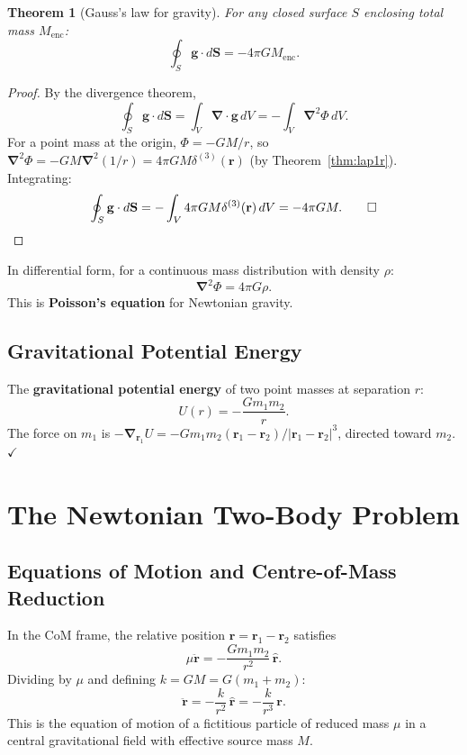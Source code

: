 \documentclass[12pt,a4paper]{article}
\theoremstyle{plain}
\newtheorem{theorem}{Theorem}[section]
\theoremstyle{definition}
\theoremstyle{remark}
\newcommand{\ve}[1]{\mathbf{#1}}           %
\newcommand{\er}{\hat{\mathbf{r}}}
\newcommand{\rv}{\ve{r}}
\newcommand{\gv}{\ve{g}}
\newcommand{\nab}{\boldsymbol{\nabla}}
\begin{document}
\begin{theorem}[Gauss's law for gravity]\label{thm:gauss}
For any closed surface $S$ enclosing total mass $M_{\mathrm{enc}}$:
\[
  \oint_S \gv\cdot d\ve{S} = -4\pi G M_{\mathrm{enc}}.
\]
\end{theorem}
\begin{proof}
By the divergence theorem,
\[
  \oint_S\gv\cdot d\ve{S}
  = \int_V\nab\cdot\gv\,dV
  = -\int_V\nab^2\Phi\,dV.
\]
For a point mass at the origin, $\Phi = -GM/r$, so $\nab^2\Phi = -GM\nab^2(1/r) = 4\pi GM\delta^{(3)}(\rv)$ (by Theorem~\ref{thm:lap1r}). Integrating:
\[
  \oint_S\gv\cdot d\ve{S} = -\int_V 4\pi GM\delta^{(3)}(\rv)\,dV = -4\pi GM. \qed
\]
\end{proof}

In differential form, for a continuous mass distribution with density $\rho$:
\begin{equation}\label{eq:poisson}
  \nab^2\Phi = 4\pi G\rho.
\end{equation}
This is \textbf{Poisson's equation} for Newtonian gravity.

\subsection{Gravitational Potential Energy}

The \textbf{gravitational potential energy} of two point masses at separation $r$:
\[
  U(r) = -\frac{Gm_1m_2}{r}.
\]
The force on $m_1$ is $-\nab_{\rv_1}U = -Gm_1m_2(\rv_1-\rv_2)/|\rv_1-\rv_2|^3$, directed toward $m_2$. $\checkmark$

\section{The Newtonian Two-Body Problem}

\subsection{Equations of Motion and Centre-of-Mass Reduction}

In the CoM frame, the relative position $\rv = \rv_1-\rv_2$ satisfies
\[
  \mu\ddot{\rv} = -\frac{Gm_1m_2}{r^2}\,\er.
\]
Dividing by $\mu$ and defining $k = GM = G(m_1+m_2)$:
\begin{equation}\label{eq:eom}
  \boxed{\ddot{\rv} = -\frac{k}{r^2}\,\er = -\frac{k}{r^3}\,\rv.}
\end{equation}
This is the equation of motion of a fictitious particle of reduced mass $\mu$ in a central gravitational field with effective source mass $M$.
\end{document}
